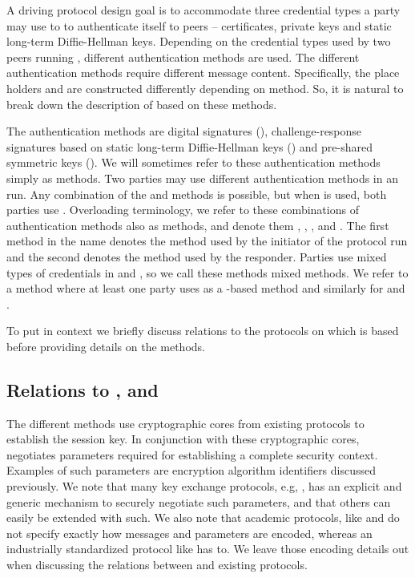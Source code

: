 A driving protocol design goal is to accommodate three credential types
a party may use to to authenticate itself to peers -- certificates, private keys
and static long-term Diffie-Hellman keys.
%
Depending on the credential types used by two peers running \mEdhoc{}, different
authentication methods are used.
%
The different authentication methods require different message content.
%
Specifically, the place holders \mAuthi{} and \mAuthr{} are constructed
differently depending on method.
%
So, it is natural to break down the description of \mEdhoc{} based on
these methods.
%

The authentication methods are digital signatures
(\mSig), challenge-response signatures based on static long-term Diffie-Hellman
keys (\mStat) and pre-shared symmetric keys (\mPsk).
%
We will sometimes refer to these authentication methods simply as methods.
%
Two parties may use different authentication methods in an \mEdhoc{} run.
%
Any combination of the \mSig{} and \mStat{} methods is possible, but when
\mPsk{} is used, both parties use \mPsk{}.
%
Overloading terminology, we refer to these combinations of authentication
methods also as methods, and
denote them \mSigSig, \mSigStat, \mStatStat, \mStatSig{} and \mPskPsk.
%
The first method in the name denotes the method used by the initiator of the
protocol run and the second denotes the method used by the responder.
%
Parties use mixed types of credentials in \mSigStat{} and \mStatSig{}, so
we call these methods mixed methods.
%
We refer to a method where at least one party uses \mSig{} as a \mSig-based
method and similarly for \mStat{} and \mPsk.
%

To put \mEdhoc{} in context we briefly discuss relations to
the protocols on which \mEdhoc{} is based before providing details on the
methods.
%

\subsection{Relations to \mSigma, \mOptls{} and \mNoise{}}
\label{sec:relationsToOtherProtocols}
The different methods use cryptographic cores from existing protocols to
establish the session key.
%
In conjunction with these cryptographic cores, \mEdhoc{} negotiates parameters
required for establishing a complete \mOscore{} security context.
%
Examples of such parameters are encryption algorithm identifiers discussed
previously.
%
We note that many key exchange protocols, e.g, \mSigma{}, has an explicit and
generic mechanism to securely negotiate such parameters, and that others can
easily be extended with such.
%
We also note that academic protocols, like \mSigma{} and \mOptls{} do not
specify exactly how messages and parameters are encoded, whereas an
industrially standardized protocol like \mEdhoc{} has to.
%
We leave those encoding details out when discussing the relations between
\mEdhoc{} and existing protocols.
%

